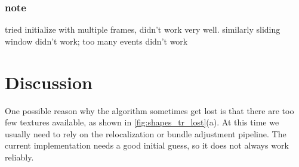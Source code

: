 \subsection{note}
\label{sec:note}

tried initialize with multiple frames, didn't work very
well. similarly sliding window didn't work; too many events didn't
work

\chapter{Discussion}
\label{chap:discussion}
One possible reason why the algorithm sometimes get lost is that there
are too few textures available, as shown in
\cref{fig:shapes_tr_lost}(a). At this time we usually need to rely on
the relocalization or bundle adjustment pipeline. The current
implementation needs a good initial guess, so it does not always work
reliably.
